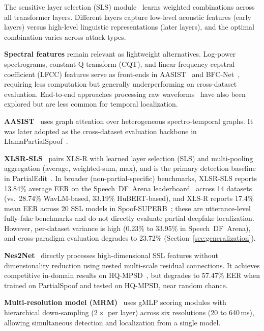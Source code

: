 \documentclass[journal]{IEEEtran}
\begin{document}
The sensitive layer selection (SLS) module~\cite{zhang2024xlrsls} learns weighted combinations across all transformer layers. Different layers capture low-level acoustic features (early layers) versus high-level linguistic representations (later layers), and the optimal combination varies across attack types.

\textbf{Spectral features} remain relevant as lightweight alternatives. Log-power spectrograms, constant-Q transform (CQT), and linear frequency cepstral coefficient (LFCC) features serve as front-ends in AASIST~\cite{jung2022aasist} and BFC-Net~\cite{zhou2025bfcnet}, requiring less computation but generally underperforming on cross-dataset evaluation. End-to-end approaches processing raw waveforms~\cite{tak2021rawnet2} have also been explored but are less common for temporal localization.

\textbf{AASIST}~\cite{jung2022aasist} uses graph attention over heterogeneous spectro-temporal graphs. It was later adopted as the cross-dataset evaluation backbone in LlamaPartialSpoof~\cite{luong2025llamapartialspoof}.

\textbf{XLSR-SLS}~\cite{zhang2024xlrsls} pairs XLS-R with learned layer selection (SLS) and multi-pooling aggregation (average, weighted-sum, max), and is the primary detection baseline in PartialEdit~\cite{zhang2025partialedit}. In broader (non-partial-specific) benchmarks, XLSR-SLS reports 13.84\% average EER on the Speech~DF~Arena leaderboard~\cite{speechdfarena2025} across 14 datasets (vs.\ 28.74\% WavLM-based, 33.19\% HuBERT-based), and XLS-R reports 17.4\% mean EER across 20 SSL models in Spoof-SUPERB~\cite{ali2026spoofsuperb}; these are utterance-level fully-fake benchmarks and do not directly evaluate partial deepfake localization. However, per-dataset variance is high (0.23\% to 33.95\% in Speech~DF~Arena), and cross-paradigm evaluation degrades to 23.72\% (Section~\ref{sec:generalization}).

\textbf{Nes2Net}~\cite{liu2025nes2net} directly processes high-dimensional SSL features without dimensionality reduction using nested multi-scale residual connections. It achieves competitive in-domain results on HQ-MPSD~\cite{li2025hqmpsd}, but degrades to 57.47\% EER when trained on PartialSpoof and tested on HQ-MPSD, near random chance.

\textbf{Multi-resolution model (MRM)}~\cite{zhang2023partialspoof} uses gMLP scoring modules with hierarchical down-sampling ($2\times$ per layer) across six resolutions (20 to 640\,ms), allowing simultaneous detection and localization from a single model.
\end{document}
